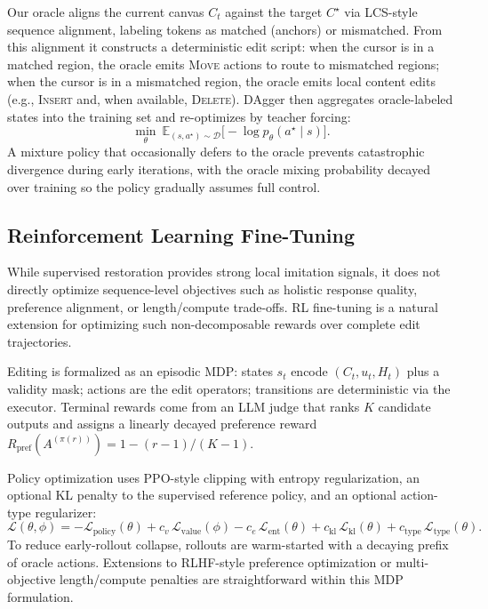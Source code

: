 \documentclass[11pt]{article}
\DeclareRobustCommand{\Insert}{\ifmmode\text{\textsc{Insert}}\else\textsc{Insert}\fi}
\DeclareRobustCommand{\Move}{\ifmmode\text{\textsc{Move}}\else\textsc{Move}\fi}
\DeclareRobustCommand{\Delete}{\ifmmode\text{\textsc{Delete}}\else\textsc{Delete}\fi}
\begin{document}
Our oracle aligns the current canvas $C_t$ against the target $C^\star$ via LCS-style sequence alignment, labeling tokens as matched (anchors) or mismatched. From this alignment it constructs a deterministic edit script: when the cursor is in a matched region, the oracle emits \Move{} actions to route to mismatched regions; when the cursor is in a mismatched region, the oracle emits local content edits (e.g., \Insert{} and, when available, \Delete{}). DAgger then aggregates oracle-labeled states into the training set and re-optimizes by teacher forcing:
\[
\min_\theta~\mathbb{E}_{(s,a^\star)\sim \mathcal{D}}\big[-\log p_\theta(a^\star \mid s)\big].
\]
A mixture policy that occasionally defers to the oracle prevents catastrophic divergence during early iterations, with the oracle mixing probability decayed over training so the policy gradually assumes full control.

\subsection{Reinforcement Learning Fine-Tuning}
\label{sec:rl}

While supervised restoration provides strong local imitation signals, it does not directly optimize sequence-level objectives such as holistic response quality, preference alignment, or length/compute trade-offs. RL fine-tuning is a natural extension for optimizing such non-decomposable rewards over complete edit trajectories.

Editing is formalized as an episodic MDP: states $s_t$ encode $(C_t, u_t, H_t)$ plus a validity mask; actions are the edit operators; transitions are deterministic via the executor. Terminal rewards come from an LLM judge that ranks $K$ candidate outputs and assigns a linearly decayed preference reward $R_\text{pref}(A^{(\pi(r))}) = 1 - (r-1)/(K-1)$.

Policy optimization uses PPO-style clipping with entropy regularization, an optional KL penalty to the supervised reference policy, and an optional action-type regularizer:
\[
\mathcal{L}(\theta,\phi)
= -\mathcal{L}_{\text{policy}}(\theta)
+ c_v\,\mathcal{L}_{\text{value}}(\phi)
- c_e\,\mathcal{L}_{\text{ent}}(\theta)
+ c_\text{kl}\,\mathcal{L}_{\text{kl}}(\theta)
+ c_\text{type}\,\mathcal{L}_{\text{type}}(\theta).
\]
To reduce early-rollout collapse, rollouts are warm-started with a decaying prefix of oracle actions. Extensions to RLHF-style preference optimization or multi-objective length/compute penalties are straightforward within this MDP formulation.
\end{document}
